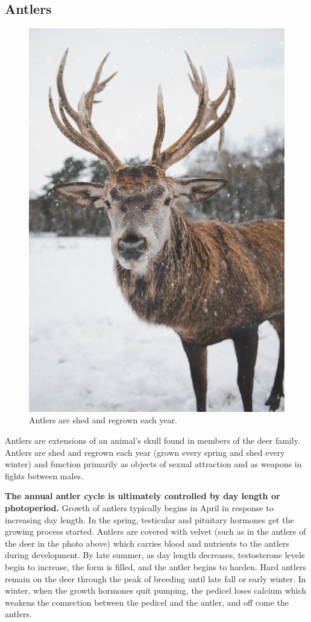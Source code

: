 \documentclass[]{book}
\begin{document}
\hypertarget{antlers}{%
\subsection{Antlers}\label{antlers}}

\begin{figure}

{\centering \includegraphics[width=0.6\linewidth]{figures/antler} 

}

\caption{Antlers are shed and regrown each year.}\label{fig:antler}
\end{figure}

Antlers are extensions of an animal's skull found in members of the deer family. Antlers are shed and regrown each year (grown every spring and shed every winter) and function primarily as objects of sexual attraction and as weapons in fights between males.

\textbf{The annual antler cycle is ultimately controlled by day length or photoperiod.} Growth of antlers typically begins in April in response to increasing day length. In the spring, testicular and pituitary hormones get the growing process started. Antlers are covered with velvet (such as in the antlers of the deer in the photo above) which carries blood and nutrients to the antlers during development. By late summer, as day length decreases, testosterone levels begin to increase, the form is filled, and the antler begins to harden. Hard antlers remain on the deer through the peak of breeding until late fall or early winter. In winter, when the growth hormones quit pumping, the pedicel loses calcium which weakens the connection between the pedicel and the antler, and off come the antlers.
\end{document}
